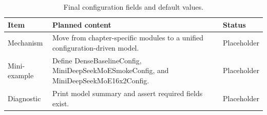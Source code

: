 \begin{table}[H]
\centering
\caption{Final configuration fields and default values.}
\label{tab:ch10-configuration-objects-and-model-variants}
\begin{tabularx}{\textwidth}{p{}X p{}}
\toprule
Item & Planned content & Status \\
\midrule
Mechanism & Move from chapter-specific modules to a unified configuration-driven model. & Placeholder \\
Mini-example & Define DenseBaselineConfig, MiniDeepSeekMoESmokeConfig, and MiniDeepSeekMoE16x2Config. & Placeholder \\
Diagnostic & Print model summary and assert required fields exist. & Placeholder \\
\bottomrule
\end{tabularx}
\end{table}
